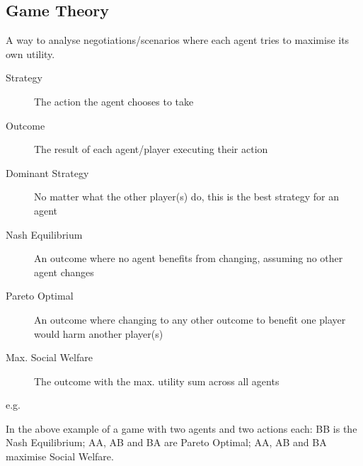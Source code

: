 \subsection{Game Theory}
A way to analyse negotiations/scenarios where each agent tries to maximise its own utility. 
\begin{description}
    \item[Strategy] The action the agent chooses to take
    \item[Outcome] The result of each agent/player executing their action
    \item[Dominant Strategy] No matter what the other player(s) do, this is the best strategy for an agent
    \item[Nash Equilibrium] An outcome where no agent benefits from changing, assuming no other agent changes
    \item[Pareto Optimal] An outcome where changing to any other outcome to benefit one player would harm another player(s)
    \item[Max. Social Welfare] The outcome with the max. utility sum across all agents
\end{description}
e.g.
\begin{table}[H]
\tiny
\centering
{}
\end{table}
In the above example of a game with two agents and two actions each: BB is the Nash Equilibrium; AA, AB and BA are Pareto Optimal; AA, AB and BA maximise Social Welfare. 

